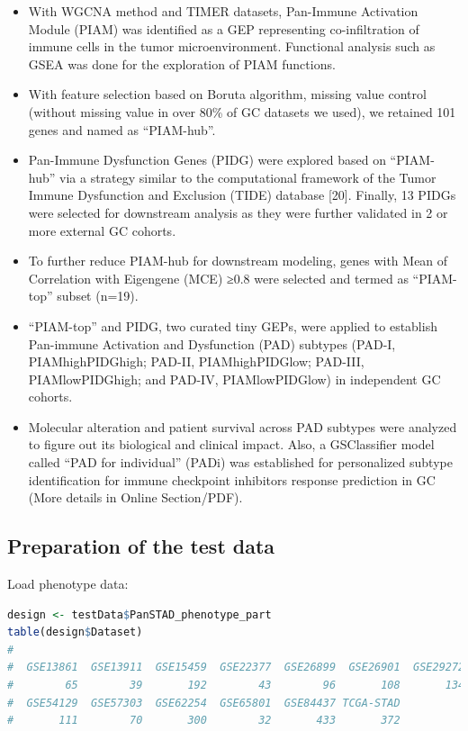 \documentclass[
  12pt,
]{book}
\begin{document}
\begin{itemize}
\item
  With WGCNA method and TIMER datasets, Pan-Immune Activation Module (PIAM) was identified as a GEP representing co-infiltration of immune cells in the tumor microenvironment. Functional analysis such as GSEA was done for the exploration of PIAM functions.
\item
  With feature selection based on Boruta algorithm, missing value control (without missing value in over 80\% of GC datasets we used), we retained 101 genes and named as ``PIAM-hub''.
\item
  Pan-Immune Dysfunction Genes (PIDG) were explored based on ``PIAM-hub'' via a strategy similar to the computational framework of the Tumor Immune Dysfunction and Exclusion (TIDE) database {[}20{]}. Finally, 13 PIDGs were selected for downstream analysis as they were further validated in 2 or more external GC cohorts.
\item
  To further reduce PIAM-hub for downstream modeling, genes with Mean of Correlation with Eigengene (MCE) ≥0.8 were selected and termed as ``PIAM-top'' subset (n=19).
\item
  ``PIAM-top'' and PIDG, two curated tiny GEPs, were applied to establish Pan-immune Activation and Dysfunction (PAD) subtypes (PAD-I, PIAMhighPIDGhigh; PAD-II, PIAMhighPIDGlow; PAD-III, PIAMlowPIDGhigh; and PAD-IV, PIAMlowPIDGlow) in independent GC cohorts.
\item
  Molecular alteration and patient survival across PAD subtypes were analyzed to figure out its biological and clinical impact. Also, a GSClassifier model called ``PAD for individual'' (PADi) was established for personalized subtype identification for immune checkpoint inhibitors response prediction in GC (More details in Online Section/PDF).
\end{itemize}

\hypertarget{preparation-of-the-test-data}{%
\subsection{Preparation of the test data}\label{preparation-of-the-test-data}}

Load phenotype data:

\begin{lstlisting}[language=R]
design <- testData$PanSTAD_phenotype_part
table(design$Dataset)
# 
#  GSE13861  GSE13911  GSE15459  GSE22377  GSE26899  GSE26901  GSE29272  GSE51105 
#        65        39       192        43        96       108       134        94 
#  GSE54129  GSE57303  GSE62254  GSE65801  GSE84437 TCGA-STAD 
#       111        70       300        32       433       372
\end{lstlisting}
\end{document}

